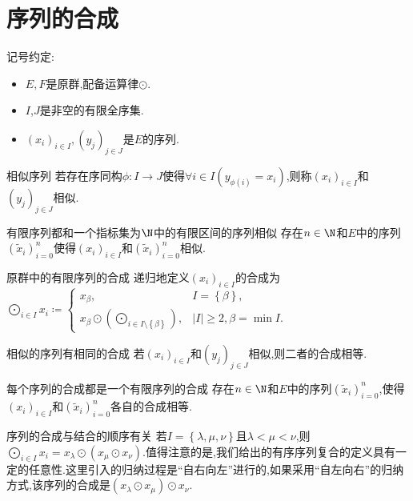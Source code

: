 \section{序列的合成}

记号约定:
\begin{itemize}
	\item $E,F$是原群,配备运算律$\odot$.
	\item $I$,$J$是非空的有限全序集.
	\item $\left(x_{i}\right)_{i\in I},\left(y_{j}\right)_{j\in J}$是$E$的序列.
\end{itemize}

\begin{definition}{相似序列}{}
	若存在序同构$\phi:I\to J$使得$\forall i\in I\left(y_{\phi\left(i\right)}=x_{i}\right)$,则称$\left(x_{i}\right)_{i\in I}$和$\left(y_{j}\right)_{j\in J}$相似.
\end{definition}

\begin{lemma}{有限序列都和一个指标集为$\N$中的有限区间的序列相似}{}
	存在$n\in\N$和$E$中的序列$\left(\tilde{x}_{i}\right)_{i=0}^{n}$使得$\left(x_{i}\right)_{i\in I}$和$\left(\tilde{x}_{i}\right)_{i=0}^{n}$相似.
\end{lemma}

\begin{definition}{原群中的有限序列的合成}{}
	递归地定义$\left(x_{i}\right)_{i\in I}$的合成为$\bigodot\limits_{i\in I}x_{i}\coloneq
	\begin{cases}
		x_{\beta},&I=\left\{\beta\right\},\\
		x_{\beta}\odot\left(\bigodot\limits_{i\in I\setminus\left\{\beta\right\}}\right),&\left|I\right|\geq 2,\beta=\min I.
	\end{cases}$
\end{definition}

\begin{proposition}{相似的序列有相同的合成}{}
	若$\left(x_{i}\right)_{i\in I}$和$\left(y_{j}\right)_{j\in J}$相似,则二者的合成相等.
\end{proposition}

\begin{corollary}{每个序列的合成都是一个有限序列的合成}{}
	存在$n\in\N$和$E$中的序列$\left(\tilde{x}_{i}\right)_{i=0}^{n}$,使得$\left(x_{i}\right)_{i\in I}$和$\left(\tilde{x}_{i}\right)_{i=0}^{n}$各自的合成相等.
\end{corollary}

\begin{remark}{序列的合成与结合的顺序有关}{}	
	若$I=\left\{\lambda,\mu,\nu\right\}$且$\lambda<\mu<\nu$,则$\bigodot\limits_{i\in I}x_{i}=x_{\lambda}\odot\left(x_{\mu}\odot x_{\nu}\right)$.值得注意的是,我们给出的有序序列复合的定义具有一定的任意性.这里引入的归纳过程是``自右向左''进行的,如果采用``自左向右''的归纳方式,该序列的合成是$\left(x_{\lambda}\odot x_{\mu}\right)\odot x_{\nu}$.
\end{remark}

